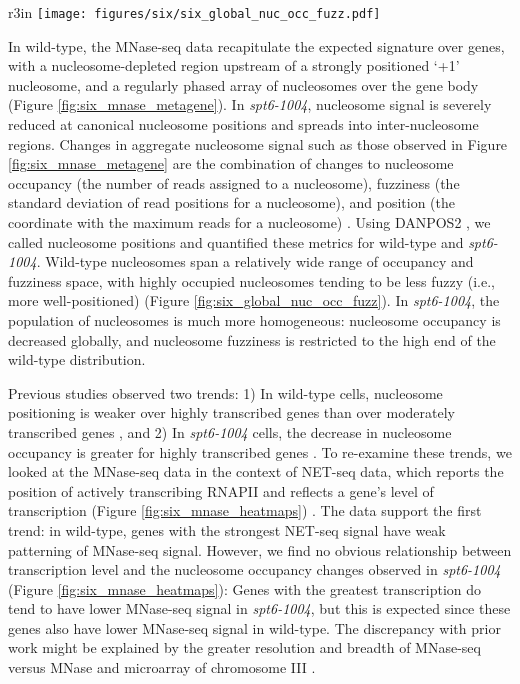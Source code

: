 \begin{wrapfigure}[10]{r}{3in}
    \centering
    \texttt{[image: figures/six/six\_global\_nuc\_occ\_fuzz.pdf]}
    \caption[Contour plot of nucleosome occupancy and fuzziness in wild-type and \textit{spt6-1004}.]{Contour plot of the distribution of nucleosome occupancy and fuzziness in wild-type and \textit{spt6-1004}. Dashed lines indicate median values.}
    \label{fig:six_global_nuc_occ_fuzz}
\end{wrapfigure}
In wild-type, the MNase-seq data recapitulate the expected signature over genes, with a nucleosome-depleted region upstream of a strongly positioned `+1' nucleosome, and a regularly phased array of nucleosomes over the gene body (Figure \ref{fig:six_mnase_metagene}).
In \textit{spt6-1004}, nucleosome signal is severely reduced at canonical nucleosome positions and spreads into inter-nucleosome regions.
Changes in aggregate nucleosome signal such as those observed in Figure \ref{fig:six_mnase_metagene} are the combination of changes to nucleosome occupancy (the number of reads assigned to a nucleosome), fuzziness (the standard deviation of read positions for a nucleosome), and position (the coordinate with the maximum reads for a nucleosome) \citep{chen2013}.
Using DANPOS2 \citep{chen2013}, we called nucleosome positions and quantified these metrics for wild-type and \textit{spt6-1004}.
Wild-type nucleosomes span a relatively wide range of occupancy and fuzziness space, with highly occupied nucleosomes tending to be less fuzzy (i.e., more well-positioned) (Figure \ref{fig:six_global_nuc_occ_fuzz}).
In \textit{spt6-1004}, the population of nucleosomes is much more homogeneous: nucleosome occupancy is decreased globally, and nucleosome fuzziness is restricted to the high end of the wild-type distribution.

Previous studies observed two trends: 1) In wild-type cells, nucleosome positioning is weaker over highly transcribed genes than over moderately transcribed genes \citep{shivaswamy2008}, and 2) In \textit{spt6-1004} cells, the decrease in nucleosome occupancy is greater for highly transcribed genes \citep{ivanovska2011}.
To re-examine these trends, we looked at the MNase-seq data in the context of NET-seq data, which reports the position of actively transcribing RNAPII and reflects a gene's level of transcription (Figure \ref{fig:six_mnase_heatmaps}) \citep{churchman2012}.
The data support the first trend: in wild-type, genes with the strongest NET-seq signal have weak patterning of MNase-seq signal.
However, we find no obvious relationship between transcription level and the nucleosome occupancy changes observed in \textit{spt6-1004} (Figure \ref{fig:six_mnase_heatmaps}): Genes with the greatest transcription do tend to have lower MNase-seq signal in \textit{spt6-1004}, but this is expected since these genes also have lower MNase-seq signal in wild-type.
The discrepancy with prior work might be explained by the greater resolution and breadth of MNase-seq versus MNase and microarray of chromosome III \citep{ivanovska2011}.

